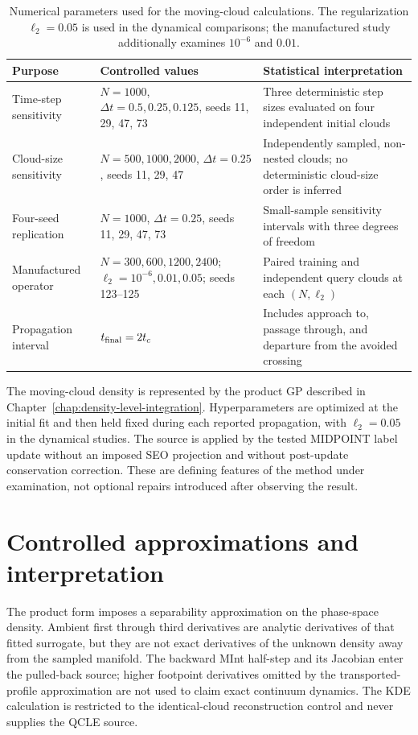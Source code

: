 \documentclass[
  11pt,
  letterpaper,
  onehalfspacing,
  normalmargins,
  equalmargins,
  oneside
]{ut-thesis}
\begin{document}
\begin{table}[tbp]
\centering
\small
\caption{Numerical parameters used for the moving-cloud calculations. The
regularization \(\ell_2=0.05\) is used in the dynamical comparisons; the
manufactured study additionally examines \(10^{-6}\) and \(0.01\).}
\label{apptab:dynamical-parameters}
\begin{tabular}{L{0.29\textwidth}L{0.25\textwidth}L{0.36\textwidth}}
\toprule
Purpose & Controlled values & Statistical interpretation \\
\midrule
Time-step sensitivity & \(N=1000\), \(\Delta t=0.5,0.25,0.125\), seeds 11, 29, 47, 73 & Three deterministic step sizes evaluated on four independent initial clouds \\
Cloud-size sensitivity & \(N=500,1000,2000\), \(\Delta t=0.25\), seeds 11, 29, 47 & Independently sampled, non-nested clouds; no deterministic cloud-size order is inferred \\
Four-seed replication & \(N=1000\), \(\Delta t=0.25\), seeds 11, 29, 47, 73 & Small-sample sensitivity intervals with three degrees of freedom \\
Manufactured operator & \(N=300,600,1200,2400\); \(\ell_2=10^{-6},0.01,0.05\); seeds 123--125 & Paired training and independent query clouds at each \((N,\ell_2)\) \\
Propagation interval & \(t_{\rm final}=2t_c\) & Includes approach to, passage through, and departure from the avoided crossing \\
\bottomrule
\end{tabular}
\end{table}

The moving-cloud density is represented by the product GP described in
Chapter~\ref{chap:density-level-integration}. Hyperparameters are optimized at
the initial fit and then held fixed during each reported propagation, with
\(\ell_2=0.05\) in the dynamical studies. The source is applied by the tested
MIDPOINT label update without an imposed SEO projection and without
post-update conservation correction. These are defining features of the
method under examination, not optional repairs introduced after observing the
result.

\section{Controlled approximations and interpretation}
\label{appsec:controlled-approximations}

The product form imposes a separability approximation on the phase-space
density. Ambient first through third derivatives are analytic derivatives of
that fitted surrogate, but they are not exact derivatives of the unknown
density away from the sampled manifold. The backward MInt half-step and its
Jacobian enter the pulled-back source; higher footpoint derivatives omitted by
the transported-profile approximation are not used to claim exact continuum
dynamics. The KDE calculation is restricted to the identical-cloud
reconstruction control and never supplies the QCLE source.
\end{document}
